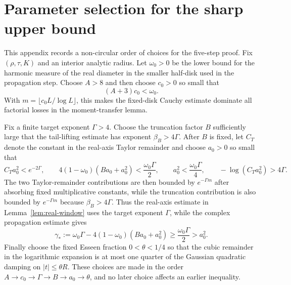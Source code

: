 \section{Parameter selection for the sharp upper bound}\label{app:parameters}

This appendix records a non-circular order of choices for the five-step proof. Fix $(\rho,\tau,K)$ and an interior analytic radius. Let $\omega_0>0$ be the lower bound for the harmonic measure of the real diameter in the smaller half-disk used in the propagation step. Choose $A>8$ and then choose $c_0>0$ so small that
\[
(A+3)c_0<\omega_0.
\]
With $m=\lfloor c_0L/\log L\rfloor$, this makes the fixed-disk Cauchy estimate dominate all factorial losses in the moment-transfer lemma.

Fix a finite target exponent $\Gamma>4$. Choose the truncation factor $B$ sufficiently large that the tail-lifting estimate has exponent $\beta_B>4\Gamma$. After $B$ is fixed, let $C_T$ denote the constant in the real-axis Taylor remainder and choose $a_0>0$ so small that
\[
C_Ta_0^2<e^{-2\Gamma},
\qquad
4(1-\omega_0)(Ba_0+a_0^2)<\frac{\omega_0\Gamma}{2},
\qquad
a_0^2<\frac{\omega_0\Gamma}{4},
\qquad
-\log(C_Ta_0^2)>4\Gamma.
\]
The two Taylor-remainder contributions are then bounded by $e^{-\Gamma m}$ after absorbing fixed multiplicative constants, while the truncation contribution is also bounded by $e^{-\Gamma m}$ because $\beta_B>4\Gamma$. Thus the real-axis estimate in Lemma~\ref{lem:real-window} uses the target exponent $\Gamma$, while the complex propagation estimate gives
\[
\gamma_*:=\omega_0\Gamma-4(1-\omega_0)(Ba_0+a_0^2)
\ge\frac{\omega_0\Gamma}{2}>a_0^2.
\]
Finally choose the fixed Esseen fraction $0<\theta<1/4$ so that the cubic remainder in the logarithmic expansion is at most one quarter of the Gaussian quadratic damping on $|t|\le\theta R$. These choices are made in the order $A\to c_0\to\Gamma\to B\to a_0\to\theta$, and no later choice affects an earlier inequality.
